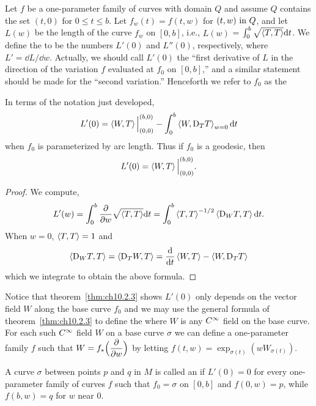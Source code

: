 \documentclass[../main]{subfiles}
\begin{document}
Let $f$ be a one-parameter family of curves with domain $Q$ and assume $Q$ contains the set $(t, 0)$ for $0 \leq t \leq b$. Let $f_w(t) = f(t, w)$ for $(t, w) \text{ in } Q$, and let $L(w)$ be the length of the curve $f_w$ on $[0,b]$, i.e., $L(w)$ = $\int_0^b \sqrt{\left\langle T,T\right\rangle} \mathrm{d}t$. We define the  to be the numbers $L'(0)$ and $L''(0)$, respectively, where $L' = \dd{L}/\dd{w}$. Actually, we should call $L'(0)$ the ``first derivative of $L$ in the direction of the variation $f$ evaluated at $f_0$ on $[0,b]$,'' and a similar statement should be made for the ``second variation.'' Henceforth we refer to $f_0$ as the 



\begin{theorem} \label{thm:ch10.2.3}
    In terms of the notation just developed,
    \[ L'(0) = \left\langle W,T\right\rangle\Big|_{(0,0)}^{(b,0)} - \int_0^b \left\langle W,\mathrm{D}_T T\right\rangle_{w=0} \mathrm{d}t \]
    when $f_0$ is parameterized by arc length. Thus if $f_0$ is a geodesic, then
    \[ L'(0) = \left\langle W,T\right\rangle\Big|_{(0,0)}^{(b,0)}\text{.} \]
\end{theorem}

\begin{proof}
    We compute,
    \[ L'(w) = \int_0^b \frac{\partial}{\partial w} \sqrt{\left\langle T,T\right\rangle} \mathrm{d}t = \int_0^b \left\langle T,T\right\rangle^{-1/2} \left\langle\mathrm{D}_W T,T\right\rangle \mathrm{d}t\text{.} \]
    When $w = 0$, $\left\langle T,T\right\rangle = 1$ and
    \[ \ip{\connection_W T}{T} = \ip{\connection_T W}{T} = \dv{}{t}\ip{W}{T} - \ip{W}{\connection_T T} \]
    which we integrate to obtain the above formula.
\end{proof}



Notice that theorem~\ref{thm:ch10.2.3} shows $L'(0)$ only depends on the vector field $W$ along the base curve $f_0$ and we may use the general formula of theorem~\ref{thm:ch10.2.3} to define the  where $W$ is any $C^\infty$ field on the base curve. For each such $C^\infty$ field $W$ on a base curve $\sigma$ we can define a one-parameter family $f$ such that $W = f_\ast\Big(\dfrac{\partial }{\partial w}\Big)$ by letting $f(t,w) = \exp_{\sigma(t)}(wW_{\sigma(t)})$.

A curve $\sigma$ between points $p$ and $q$ in $M$ is called an  if $L'(0) = 0$ for every one-parameter family of curves $f$ such that $f_0 = \sigma$ on $[0,b]$ and $f(0,w) = p$, while $f(b, w) = q$ for $w$ near $0$.
\end{document}
